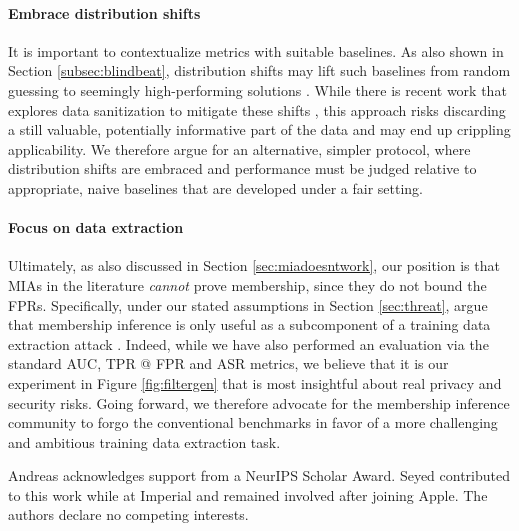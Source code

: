 \documentclass{article}
\theoremstyle{remark}
\begin{document}
\paragraph{Embrace distribution shifts} It is important to contextualize metrics with suitable baselines. As also shown in Section \ref{subsec:blindbeat}, distribution shifts may lift such baselines from random guessing to seemingly high-performing solutions \citep{das2025blind}. While there is recent work that explores data sanitization to mitigate these shifts \citep{Dubinski_2024_WACV}, this approach risks discarding a still valuable, potentially informative part of the data and may end up crippling applicability. We therefore argue for an alternative, simpler protocol, where distribution shifts are embraced and performance must be judged relative to appropriate, naive baselines that are developed under a fair setting.

\paragraph{Focus on data extraction} Ultimately, as also discussed in Section \ref{sec:miadoesntwork}, our position is that MIAs in the literature \textit{cannot} prove membership, since they do not bound the FPRs. Specifically, under our stated assumptions in Section \ref{sec:threat}, \citet{cannotmembership} argue that membership inference is only useful as a subcomponent of a training data extraction attack \citep{10.5555/3620237.3620531}. Indeed, while we have also performed an evaluation via the standard AUC, TPR @ FPR and ASR metrics, we believe that it is our experiment in Figure \ref{fig:filtergen} that is most insightful about real privacy and security risks. Going forward, we therefore advocate for the membership inference community to forgo the conventional benchmarks in favor of a more challenging and ambitious training data extraction task.

\begin{ack}
Andreas acknowledges support from a NeurIPS Scholar Award. Seyed contributed to this work while at Imperial and remained involved after joining Apple. The authors declare no competing interests.
\end{ack}

{
\small



}

\newpage

\end{document}
